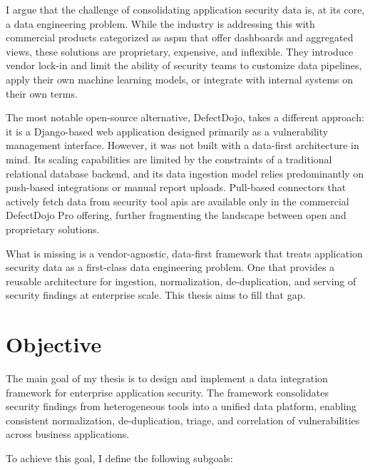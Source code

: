 I argue that the challenge of consolidating application security data is, at its core, a data engineering problem. While the industry is addressing this with commercial products categorized as \gls{aspm} that offer dashboards and aggregated views, these solutions are proprietary, expensive, and inflexible. They introduce vendor lock-in and limit the ability of security teams to customize data pipelines, apply their own machine learning models, or integrate with internal systems on their own terms.

The most notable open-source alternative, DefectDojo, takes a different approach: it is a Django-based web application designed primarily as a vulnerability management interface. However, it was not built with a data-first architecture in mind. Its scaling capabilities are limited by the constraints of a traditional relational database backend, and its data ingestion model relies predominantly on push-based integrations or manual report uploads. Pull-based connectors that actively fetch data from security tool \glspl{api} are available only in the commercial DefectDojo Pro offering, further fragmenting the landscape between open and proprietary solutions.

What is missing is a vendor-agnostic, data-first framework that treats application security data as a first-class data engineering problem. One that provides a reusable architecture for ingestion, normalization, de-duplication, and serving of security findings at enterprise scale. This thesis aims to fill that gap.

\section*{Objective}

The main goal of my thesis is to design and implement a data integration framework for enterprise application security. The framework consolidates security findings from heterogeneous tools into a unified data platform, enabling consistent normalization, de-duplication, triage, and correlation of vulnerabilities across business applications.

To achieve this goal, I define the following subgoals:

